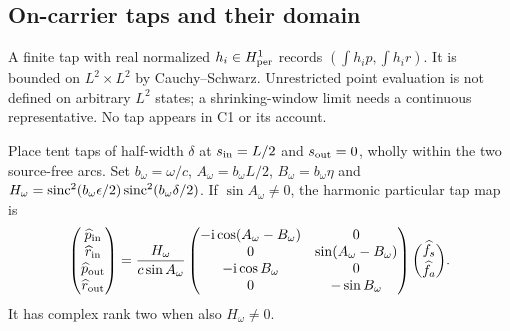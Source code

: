 \subsection{On-carrier taps and their domain}\label{sec:taps}
A finite tap with real normalized $h_i\in H^1_{\rm per}$ records $(\int h_ip,\int h_ir)$. It is bounded on $L^2\times L^2$ by Cauchy--Schwarz. Unrestricted point evaluation is not defined on arbitrary $L^2$ states; a shrinking-window limit needs a continuous representative. No tap appears in C1 or its account.

\begin{proposition}\label{prop:taps}
Place tent taps of half-width $\delta$ at $s_{\rm in}=L/2$ and $s_{\rm out}=0$, wholly within the two source-free arcs. Set $b_\omega=\omega/c$, $A_\omega=b_\omega L/2$, $B_\omega=b_\omega\eta$ and
$H_\omega=\operatorname{sinc}^2(b_\omega\epsilon/2)\operatorname{sinc}^2(b_\omega\delta/2)$. If $\sin A_\omega\ne0$, the harmonic particular tap map is
\begin{equation}\label{eq:tapmap}
 \begin{pmatrix}\widehat p_{\rm in}\\\widehat r_{\rm in}\\\widehat p_{\rm out}\\\widehat r_{\rm out}\end{pmatrix}
 =\frac{H_\omega}{c\sin A_\omega}
 \begin{pmatrix}
 -\mathrm i\cos(A_\omega-B_\omega)&0\\0&\sin(A_\omega-B_\omega)\\
 -\mathrm i\cos B_\omega&0\\0&-\sin B_\omega
 \end{pmatrix}\binom{\widehat f_s}{\widehat f_a}.
\end{equation}
It has complex rank two when also $H_\omega\ne0$.
\end{proposition}
